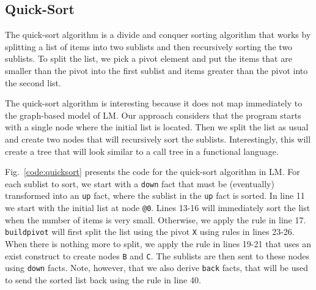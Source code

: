 \subsection{Quick-Sort}

The quick-sort algorithm is a divide and conquer sorting algorithm that works by splitting
a list of items into two sublists and then recursively sorting the two sublists.
To split the list, we pick a pivot element and put the items that are smaller than the pivot
into the first sublist and items greater than the pivot into the second list.

The quick-sort algorithm is interesting because it does not map immediately to the graph-based
model of LM. Our approach considers that the program starts with a single node where
the initial list is located. Then we split the list as usual and create two nodes
that will recursively sort the sublists. Interestingly, this will create a tree
that will look similar to a call tree in a functional language.

Fig.~\ref{code:quicksort} presents the code for the quick-sort algorithm in LM.
For each sublist to sort, we start with a \texttt{down} fact that must be (eventually)
transformed into an \texttt{up} fact, where the sublist in the \texttt{up} fact is sorted.
In line 11 we start with the initial list at node \texttt{@0}. Lines 13-16 will immediately
sort the list when the number of items is very small. Otherwise, we apply the rule in line 17.
\texttt{buildpivot} will first split the list using the pivot \texttt{X} using rules in
lines 23-26. When there is nothing more to split, we apply the rule in lines 19-21
that uses an exist construct to create nodes \texttt{B} and \texttt{C}. The sublists
are then sent to these nodes using \texttt{down} facts. Note, however, that we also
derive \texttt{back} facts, that will be used to send the sorted list back using the rule
in line 40.

